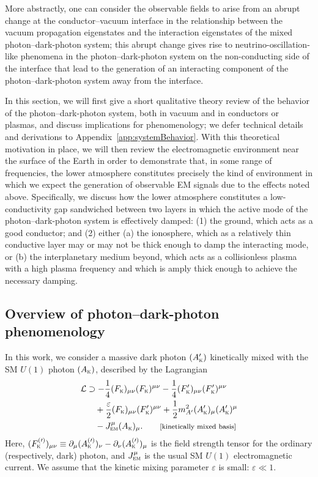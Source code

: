 \documentclass[amsmath,amssymb,aps,10pt,prd,letterpaper,nofootinbib,balancelastpage,notitlepage,superscriptaddress,twocolumn,floatfix]{revtex4-2}
\newcommand{\appref}[2][x]{Appendi{#1}~\ref{#2}}	%
\newcommand{\nl}{\nonumber \\ & \quad }					%
\newcommand{\LL}{\mathcal{L}}
\newcommand{\kin}[1]{({#1}_{\textsc{k}})}
\newcommand{\primekin}[1]{({#1}_{\textsc{k}}^\prime)}
\begin{document}
More abstractly, one can consider the observable fields to arise from an abrupt change at the conductor--vacuum interface in the relationship between the vacuum propagation eigenstates and the interaction eigenstates of the mixed photon--dark-photon system; this abrupt change gives rise to neutrino-oscillation-like phenomena in the photon--dark-photon system on the non-conducting side of the interface that lead to the generation of an interacting component of the photon--dark-photon system away from the interface.

In this section, we will first give a short qualitative theory review of the behavior of the photon--dark-photon system, both in vacuum and in conductors or plasmas, and discuss implications for phenomenology; we defer technical details and derivations to \appref{app:systemBehavior}.
With this theoretical motivation in place, we will then review the electromagnetic environment near the surface of the Earth in order to demonstrate that, in some range of frequencies, the lower atmosphere constitutes precisely the kind of environment in which we expect the generation of observable EM signals due to the effects noted above.
Specifically, we discuss how the lower atmosphere constitutes a low-conductivity gap sandwiched between two layers in which the active mode of the photon--dark-photon system is effectively damped: (1) the ground, which acts as a good conductor; and (2) either (a) the ionosphere, which as a relatively thin conductive layer may or may not be thick enough to damp the interacting mode, or (b) the interplanetary medium beyond, which acts as a collisionless plasma with a high plasma frequency and which is amply thick enough to achieve the necessary damping.


\subsection{Overview of photon--dark-photon phenomenology}
\label{sec:phenomenologyOverview}

In this work, we consider a massive dark photon $\primekin{A}$ kinetically mixed with the SM $U(1)$ photon $\kin{A}$, described by the Lagrangian
\begin{align}
    \LL &\supset - \frac{1}{4} \kin{F}_{\mu\nu}\kin{F}^{\mu\nu} - \frac{1}{4} \primekin{F}_{\mu\nu} \primekin{F}^{\mu\nu} \nl
    + \frac{\varepsilon}{2} \kin{F}_{\mu\nu} \primekin{F}^{\mu\nu} + \frac{1}{2} m_{A'}^2 \primekin{A}_\mu \primekin{A}^{\mu} \nl
    - J_{\textsc{em}}^\mu \kin{A}_\mu. \qquad \text{\footnotesize[kinetically mixed basis]}
    \label{eq:kineticallyMixedLagrangian}
\end{align}
Here, $(F_{\textsc{k}}^{(\prime)})_{\mu\nu} \equiv \partial_\mu (A_{\textsc{k}}^{(\prime)})_\nu - \partial_\nu (A_{\textsc{k}}^{(\prime)})_\mu$ is the field strength tensor for the ordinary (respectively, dark) photon, and $J_{\textsc{em}}^\mu$ is the usual SM $U(1)$ electromagnetic current.
We assume that the kinetic mixing parameter $\varepsilon$ is \linebreak small: $\varepsilon\ll1$.
\end{document}
